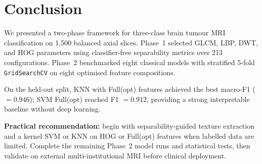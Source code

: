 \section{Conclusion}
\label{sec:conclusion}

We presented a two-phase framework for three-class brain tumour MRI classification on 1{,}500 balanced axial slices.
Phase~1 selected GLCM, LBP, DWT, and HOG parameters using classifier-free separability metrics over 213 configurations.
Phase~2 benchmarked eight classical models with stratified 5-fold \texttt{GridSearchCV} on eight optimised feature compositions.

On the held-out split, KNN with Full(opt) features achieved the best macro-F1 ($=0.946$); SVM Full(opt) reached F1 $=0.912$, providing a strong interpretable baseline without deep learning.

\textbf{Practical recommendation:} begin with separability-guided texture extraction and a kernel SVM or KNN on HOG or Full(opt) features when labelled data are limited.
Complete the remaining Phase~2 model runs and statistical tests, then validate on external multi-institutional MRI before clinical deployment.
